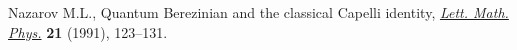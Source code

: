 Nazarov M.L., Quantum {B}erezinian and the classical {C}apelli identity,
 \href{https://doi.org/10.1007/BF00401646}{\textit{Lett. Math. Phys.}} \textbf{21} (1991), 123--131.
